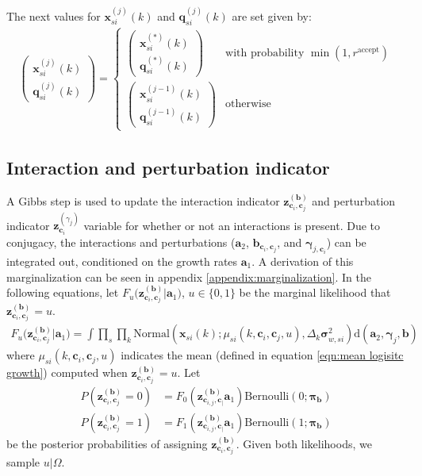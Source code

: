 \documentclass{article}
\newcommand{\Normaldist}{\text{Normal}}
\newcommand{\Bernoullidist}{\text{Bernoulli}}
\renewcommand{\c}{\mathbf{c}}
\renewcommand{\aa}[1]{\mathbf{a}_{#1}}
\newcommand{\bc}[2]{\mathbf{b}_{\c_{#1},\c_{#2}}}
\newcommand{\zbc}[2]{\mathbf{z}^{(\mathbf{b})}_{\c_{#1},\c_{#2}}}
\newcommand{\probb}{\mathbf{\pi}_{\mathbf{b}}}
\newcommand{\pert}{\mathbf{\gamma}_j}
\newcommand{\pertc}[1]{\mathbf{\gamma}_{j,\c_{#1}}}
\newcommand{\zpertc}[1]{\mathbf{z}^{(\gamma_j)}_{\c_{#1}}}
\newcommand{\x}[2]{\mathbf{x}_{#2}(#1)}
\newcommand{\xexp}[3]{\mathbf{x}^{#3}_{#2}(#1)}
\newcommand{\qexp}[3]{\mathbf{q}^{#3}_{#2}(#1)}
\newcommand{\varw}[1]{\mathbf{\sigma}^2_{w,{}#1}}
\newcommand{\dt}{\Delta_{k}}
\begin{document}
The next values for $\xexp{k}{si}{(j)}$ and $\qexp{k}{si}{(j)}$ are set given by:
\begin{align}
	\left(
	\begin{array}{ccc}
		\xexp{k}{si}{(j)} \\
		\qexp{k}{si}{(j)}
	\end{array} \right) = \begin{cases}
		\left(
		\begin{array}{ccc}
			\xexp{k}{si}{(*)} \\
			\qexp{k}{si}{(*)}
		\end{array} \right) & \text{with probability } \min( {1,r^{\text{accept}}} ) \\
	\left(
	\begin{array}{ccc}
		\xexp{k}{si}{(j-1)} \\
		\qexp{k}{si}{(j-1)}
	\end{array} \right) & \text{otherwise}
	\end{cases}
\end{align}

\subsection{Interaction and perturbation indicator}
A Gibbs step is used to update the interaction indicator $\zbc{i}{j}$ and perturbation indicator $\zpertc{i}$ variable for whether or not an interactions is present. Due to conjugacy, the interactions and perturbations ($\aa{2}$, $\bc{i}{j}$, and $\pertc{i}$) can be integrated out, conditioned on the growth rates $\aa{1}$. A derivation of this marginalization can be seen in appendix \ref{appendix:marginalization}. In the following equations, let $F_{u} \big( \zbc{i}{j} | \aa{1} \big)$, $u \in \{ 0, 1 \}$ be the marginal likelihood that $\zbc{i}{j} = u$.
\begin{align}
  F_{u} \big( \zbc{i}{j} | \aa{1} \big)= \int \prod_s \prod_k \Normaldist(\x{k}{si}; \mu_{si}(k,\c_i,\c_j,u), \dt \varw{si}) \text{d}(\aa{2}, \pert, \mathbf{b})
\end{align}
where $\mu_{si}(k,\c_i,\c_j,u)$ indicates the mean (defined in equation \ref{eqn:mean logisitc growth}) computed when $\zbc{i}{j}=u$. Let
\begin{align}
  P(\zbc{i}{j}=0) & = F_0 (\zbc{i,j} | \aa{1}) \Bernoullidist(0 ; \probb) \\
  P(\zbc{i}{j}=1) & = F_1 (\zbc{i,j} | \aa{1}) \Bernoullidist(1 ; \probb)
\end{align}
be the posterior probabilities of assigning $\zbc{i}{j}$. Given both likelihoods, we sample $u | \Omega$.
\end{document}
